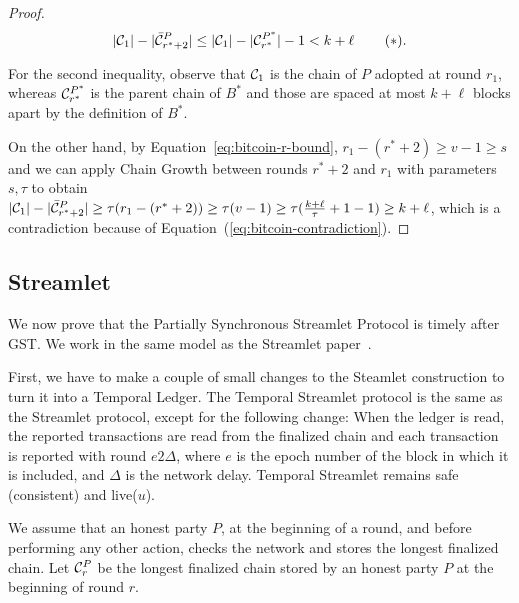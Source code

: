 \begin{proof}

  \[
     |\mathcal{C}_1| - |\bar {\mathcal{C}}^P_{r^* + 2}| \leq
     |\mathcal{C}_1| - |\mathcal{C}^{P^*}_{r^*}| - 1 <
     k + \ell\, \label{eq:bitcoin-contradiction}\tag{$\ast$}.
  \]

  For the second inequality, observe that
  $\mathcal{C}_1$ is the chain of $P$ adopted at round $r_1$,
  whereas $\mathcal{C}^{P^*}_{r^*}$ is
  the parent chain of $B^*$ and those are spaced at most $k + \ell$ blocks
  apart by the definition of $B^*$.

  On the other hand, by Equation~\ref{eq:bitcoin-r-bound}, $r_1 - (r^* + 2) \geq v - 1 \geq s$ and
  we can apply Chain Growth between rounds $r^* + 2$ and $r_1$
  with parameters $s, \tau$ to obtain
  $|\mathcal{C}_1| - |\bar {\mathcal{C}}^P_{r^* + 2}| \geq \tau(r_1 - (r^* + 2)) \geq \tau (v - 1) \geq
  \tau (\frac{k + \ell}{\tau} + 1 - 1) \geq k + \ell$,
  which is a contradiction because of Equation~(\ref{eq:bitcoin-contradiction}).

  \Qed
\end{proof}

\subsection{Streamlet}

We now prove that the Partially Synchronous Streamlet Protocol is timely
after GST.
We work in the same model as the Streamlet paper~\cite{streamlet}.

First, we have to make a couple of small changes to the Steamlet construction to turn it
into a Temporal Ledger.
The Temporal Streamlet protocol is the same as the Streamlet protocol, except
for the following change: When the ledger is \textsf{read}, the reported transactions are
read from the finalized chain and each transaction is reported with round $e 2 \Delta$,
where $e$ is the epoch number of the block in which it is included, and $\Delta$ is the
network delay.
Temporal Streamlet remains safe (consistent) and live($u$).

We assume that an honest party $P$, at the beginning of a round, and
before performing any other action, checks the network and
stores the longest finalized chain.
Let $\mathcal{C}^P_r$ be the longest finalized chain stored by an honest
party $P$ at the beginning of round $r$.

